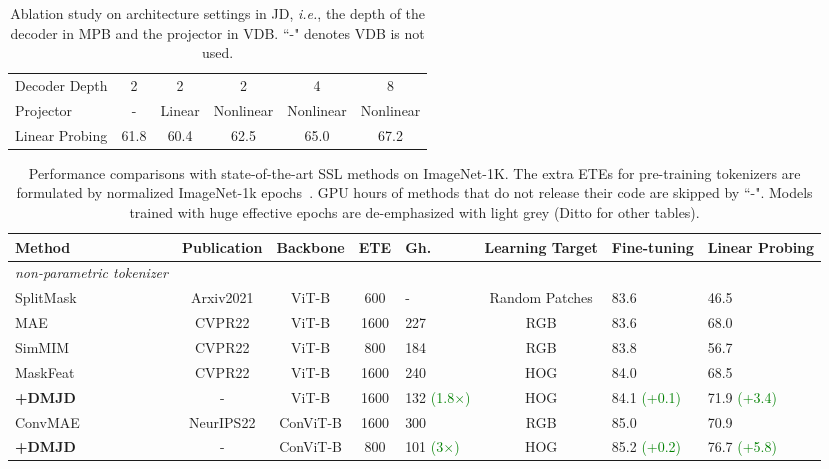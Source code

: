 \documentclass[lettersize,journal]{IEEEtran}
\begin{document}
\begin{table}[!t]
    \centering
    \caption{Ablation study on architecture settings in JD, \textit{i.e.}, the depth of the decoder in MPB and the projector in VDB. ``-" denotes VDB is not used.}
    \label{tab:vdb}
    \begin{tabular}{lccccc}
      \toprule
      Decoder Depth & 2 & 2 & 2 & 4 & 8 \\ 
      Projector  & - & Linear & Nonlinear & Nonlinear & Nonlinear \\ 
      \midrule
      Linear Probing & 61.8 & 60.4 & 62.5 & 65.0 & 67.2 \\
      \bottomrule
    \end{tabular}
\end{table}

\begin{table*}
\begin{center}
  \caption{Performance comparisons with state-of-the-art SSL methods on ImageNet-1K. The extra ETEs for pre-training tokenizers are formulated by normalized ImageNet-1k epochs~\cite{2021arXiv211209133W}. GPU hours of methods that do not release their code are skipped by ``-". Models trained with huge effective epochs are de-emphasized with light grey (Ditto for other tables).}
  \label{tab:sota}
      \begin{tabular}{lccclcll}
        \toprule
        Method    & Publication & Backbone & ETE & Gh. & Learning Target & Fine-tuning & Linear Probing \\
        \midrule
        \emph{non-parametric tokenizer}       \\
        SplitMask~\cite{2021arXiv211210740E} & Arxiv2021 & ViT-B & 600 & - & Random Patches & 83.6 & 46.5 \\
        MAE~\cite{2021arXiv211106377H} & CVPR22 & ViT-B & 1600 & 227 & RGB & 83.6 & 68.0 \\
        SimMIM~\cite{2021arXiv211109886X} & CVPR22 & ViT-B & 800 & 184 & RGB & 83.8 & 56.7 \\
        MaskFeat~\cite{2021arXiv211209133W} & CVPR22 & ViT-B & 1600 & 240 & HOG & 84.0 & 68.5 \\
        \rowcolor{mygray} \quad \textbf{+DMJD} & -& ViT-B & 1600 & 132 \textcolor{Green}{(1.8$\times$)} & HOG & 84.1 \textcolor{Green}{(+0.1)} & 71.9 \textcolor{Green}{(+3.4)} \\
        ConvMAE~\cite{2022arXiv220503892G} & NeurIPS22 & ConViT-B & 1600 & 300 & RGB & 85.0 & 70.9 \\
        \rowcolor{mygray} \quad \textbf{+DMJD} &- & ConViT-B & 800 & 101 \textcolor{Green}{(3$\times$)} & HOG & 85.2 \textcolor{Green}{(+0.2)} & 76.7 \textcolor{Green}{(+5.8)} \\

\end{tabular}
\end{center}
\end{table*}
\end{document}
